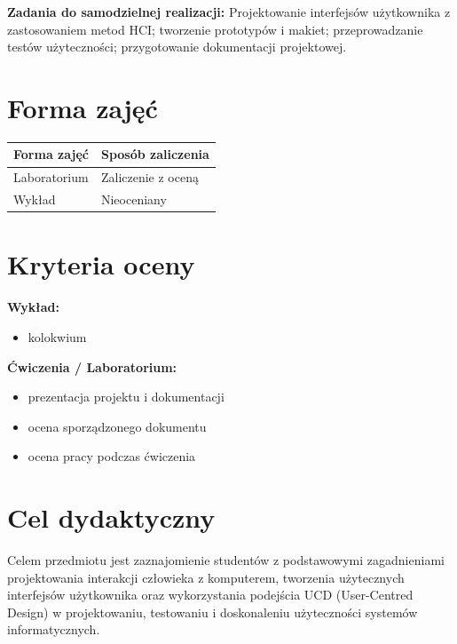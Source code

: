 \documentclass[12pt, a4paper]{article}
\newcommand{\thdrule}{\noalign{\global\setlength{\extrarowheight}{0pt}}}
\newcommand{\thdend}{\noalign{\global\setlength{\extrarowheight}{3pt}}}
\begin{document}
\vspace{4pt}
\noindent\textbf{Zadania do samodzielnej realizacji:} Projektowanie interfejsów użytkownika z zastosowaniem metod HCI; tworzenie prototypów i makiet; przeprowadzanie testów użyteczności; przygotowanie dokumentacji projektowej.

\section{Forma zajęć}

\begin{center}
{\scriptsize
\begin{tabular}{m{5cm}m{8cm}}
\thdrule\toprule
\rowcolor{pjatkRed} {\color{white}\textbf{Forma zajęć}} & {\color{white}\textbf{Sposób zaliczenia}} \\
\midrule\thdend
  \rowcolor{tableRowLight} Laboratorium & Zaliczenie z oceną \\
  \rowcolor{tableRowAlt} Wykład & Nieoceniany \\
\bottomrule
\end{tabular}}
\end{center}

\section{Kryteria oceny}

\textbf{Wykład:}
\begin{itemize}
  \item kolokwium
\end{itemize}
\vspace{4pt}
\textbf{Ćwiczenia / Laboratorium:}
\begin{itemize}
  \item prezentacja projektu i dokumentacji
  \item ocena sporządzonego dokumentu
  \item ocena pracy podczas ćwiczenia
\end{itemize}


\section{Cel dydaktyczny}

Celem przedmiotu jest zaznajomienie studentów z podstawowymi zagadnieniami projektowania interakcji człowieka z komputerem, tworzenia użytecznych interfejsów użytkownika oraz wykorzystania podejścia UCD (User-Centred Design) w projektowaniu, testowaniu i doskonaleniu użyteczności systemów informatycznych.
\end{document}
